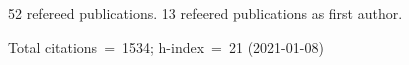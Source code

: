 52 refereed publications. 13 refeered publications as first author.

Total citations~=~1534; h-index~=~21 (2021-01-08)